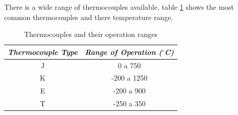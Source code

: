 	There is a wide range of thermocouples available, table \ref{table:thermocouple} shows the most common thermocouples and there temperature range.

	\begin{table}[h!]
		\centering
		\caption{Thermocouples and their operation ranges}
		\label{table:thermocouple}
		\begin{tabular}{|c|c|}
			\hline
			\textit{\textbf{Thermocouple Type}} & \textit{\textbf{Range of Operation ($^{\circ}$C)}} \\ \hline
			J & 0 a 750 \\ \hline
			K & -200 a 1250 \\ \hline
			E & -200 a 900 \\ \hline
			T & -250 a 350 \\ \hline
		\end{tabular}
	\end{table}
